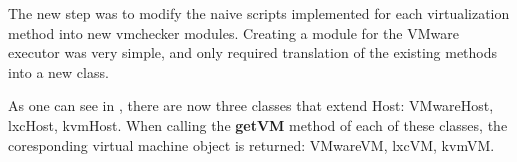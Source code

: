 The new step was to modify the naive scripts implemented for each virtualization
method into new vmchecker modules. Creating a module for the VMware executor
was very simple, and only required translation of the existing methods into a new
class.

As one can see in , there are now three
classes that extend Host: VMwareHost, lxcHost, kvmHost. When calling the
{\bf getVM} method of each of these classes, the coresponding virtual
machine object is returned: VMwareVM, lxcVM, kvmVM.

\begin{center}
\end{center}



